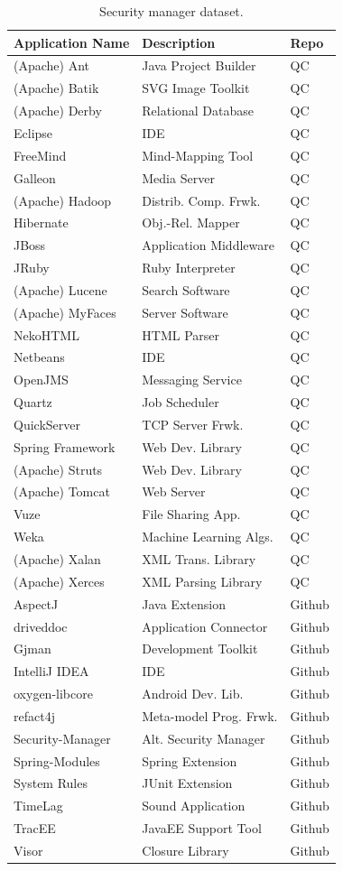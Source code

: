\documentclass{sig-alternate}
\begin{document}
\begin{table}
\caption{Security manager dataset.\label{Table:applications-studied}}
\begin{tabular}{lll}
\toprule 
Application Name & Description & Repo\tabularnewline
\midrule
(Apache) Ant & Java Project Builder & QC\tabularnewline
(Apache) Batik & SVG Image Toolkit & QC\tabularnewline
(Apache) Derby & Relational Database & QC\tabularnewline
Eclipse  & IDE & QC\tabularnewline
FreeMind & Mind-Mapping Tool & QC\tabularnewline
Galleon & Media Server & QC\tabularnewline
(Apache) Hadoop & Distrib. Comp. Frwk. & QC\tabularnewline
Hibernate & Obj.-Rel. Mapper & QC\tabularnewline
JBoss & Application Middleware & QC\tabularnewline
JRuby & Ruby Interpreter & QC\tabularnewline
(Apache) Lucene & Search Software & QC\tabularnewline
(Apache) MyFaces & Server Software & QC\tabularnewline
NekoHTML & HTML Parser & QC\tabularnewline
Netbeans & IDE & QC\tabularnewline
OpenJMS & Messaging Service & QC\tabularnewline
Quartz  & Job Scheduler & QC\tabularnewline
QuickServer & TCP Server Frwk. & QC\tabularnewline
Spring Framework & Web Dev. Library & QC\tabularnewline
(Apache) Struts & Web Dev. Library & QC\tabularnewline
(Apache) Tomcat & Web Server & QC\tabularnewline
Vuze & File Sharing App. & QC\tabularnewline
Weka & Machine Learning Algs. & QC\tabularnewline
(Apache) Xalan & XML Trans. Library & QC\tabularnewline
(Apache) Xerces & XML Parsing Library & QC\tabularnewline
AspectJ & Java Extension & Github\tabularnewline
driveddoc & Application Connector & Github\tabularnewline
Gjman & Development Toolkit & Github\tabularnewline
IntelliJ IDEA & IDE & Github\tabularnewline
oxygen-libcore & Android Dev. Lib. & Github\tabularnewline
refact4j & Meta-model Prog. Frwk. & Github\tabularnewline
Security-Manager & Alt. Security Manager & Github\tabularnewline
Spring-Modules & Spring Extension & Github\tabularnewline
System Rules & JUnit Extension & Github\tabularnewline
TimeLag & Sound Application & Github\tabularnewline
TracEE & JavaEE Support Tool & Github\tabularnewline
Visor & Closure Library & Github\tabularnewline
\bottomrule
\end{tabular}
\end{table}
\end{document}

